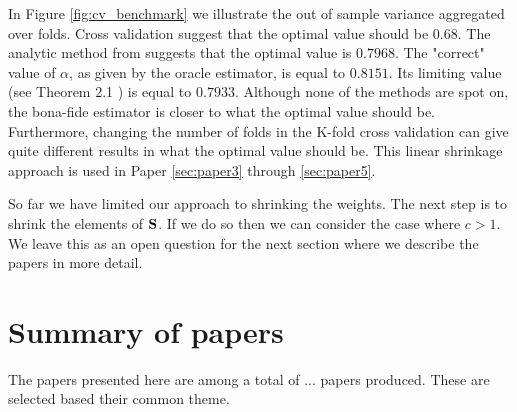 \documentclass[oneside]{book}\usepackage{knitr}
\begin{document}
In Figure \ref{fig:cv_benchmark} we illustrate the out of sample variance aggregated over folds. 
Cross validation suggest that the optimal value should be $0.68$. 
The analytic method from \citet{bodnar2018estimation} suggests that the optimal value is $0.7968$.
The "correct" value of $\alpha$, as given by the oracle estimator, is equal to $0.8151$. 
Its limiting value (see Theorem 2.1 \citet{bodnar2018estimation}) is equal to $0.7933$.
Although none of the methods are spot on, the bona-fide estimator is closer to what the optimal value should be.
Furthermore, changing the number of folds in the K-fold cross validation can give quite different results in what the optimal value should be.
This linear shrinkage approach is used in Paper \ref{sec:paper3} through \ref{sec:paper5}.

So far we have limited our approach to shrinking the weights. 
The next step is to shrink the elements of $\mathbf{S}$.
If we do so then we can consider the case where $c>1$.
We leave this as an open question for the next section where we describe the papers in more detail.

\chapter{Summary of papers}\label{ch:papersummary}


The papers presented here are among a total of ... papers produced. These are selected based their common theme.
\end{document}
